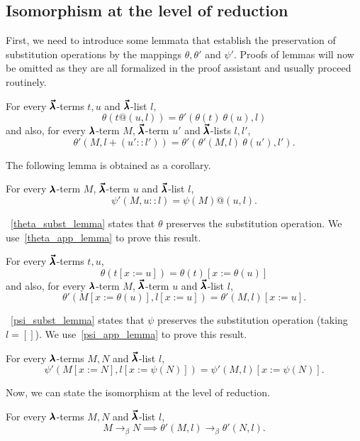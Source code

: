 \subsection{Isomorphism at the level of reduction}

First, we need to introduce some lemmata that establish the preservation of substitution operations by the mappings $\theta, \theta'$ and $\psi'$.
Proofs of lemmas will now be omitted as they are all formalized in the proof assistant and usually proceed routinely.

\begin{lemma}
  \label{theta_app_lemma}
  For every $\pmb{\vec \lambda}$-terms $t, u$ and $\pmb{\vec \lambda}$-list $l$,
  \[ \theta(t@(u, l)) = \theta'(\theta(t) \ \theta(u), l) \]
  and also, for every $\pmb{\lambda}$-term $M$, $\pmb{\vec \lambda}$-term $u'$ and $\pmb{\vec \lambda}$-lists $l, l'$,
  \[ \theta'(M, l+(u'::l')) = \theta'(\theta'(M, l) \ \theta(u'), l'). \]
\end{lemma}

The following lemma is obtained as a corollary.

\begin{lemma}
  \label{psi_app_lemma}
  For every $\pmb{\lambda}$-term $M$, $\pmb{\vec \lambda}$-term $u$ and $\pmb{\vec \lambda}$-list $l$,
  \[ \psi'(M, u :: l) = \psi(M)@(u, l). \]
\end{lemma}

~\cref{theta_subst_lemma} states that $\theta$ preserves the substitution operation.
We use~\cref{theta_app_lemma} to prove this result.

\begin{lemma}
  \label{theta_subst_lemma}
  For every $\pmb{\vec \lambda}$-terms $t, u$,
  \[ \theta(t[x := u]) = \theta(t)[x := \theta(u)] \]
  and also, for every $\pmb{\lambda}$-term $M$,  $\pmb{\vec \lambda}$-term $u$ and $\pmb{\vec \lambda}$-list $l$,
  \[ \theta'(M[x := \theta(u)], l[x := u]) = \theta'(M, l)[x := u]. \]
\end{lemma}

~\cref{psi_subst_lemma} states that $\psi$ preserves the substitution operation (taking $l = []$).
We use~\cref{psi_app_lemma} to prove this result.

\begin{lemma}
  \label{psi_subst_lemma}
  For every $\pmb{\lambda}$-terms $M, N$ and $\pmb{\vec \lambda}$-list $l$,
  \[ \psi'(M[x := N], l[x := \psi(N)]) = \psi'(M, l)[x := \psi(N)]. \]
\end{lemma}

Now, we can state the isomorphism at the level of reduction.

\begin{lemma}
  \label{theta_step_lemma}
  For every $\pmb{\lambda}$-terms $M, N$ and $\pmb{\vec \lambda}$-list $l$,
  \[ M \to_{\beta} N \implies \theta'(M, l) \to_{\beta} \theta'(N, l). \]
\end{lemma}


